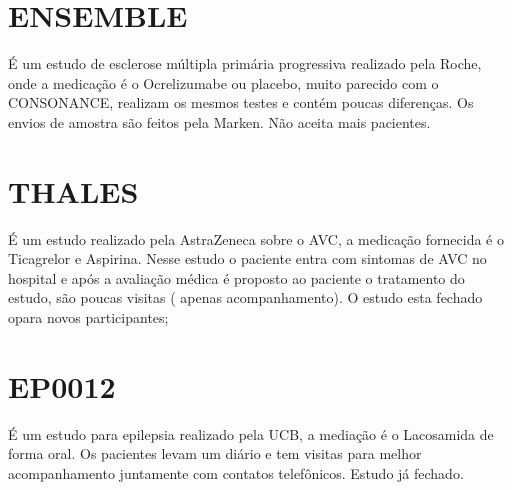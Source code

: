 \section{ENSEMBLE}

É um estudo de esclerose múltipla primária progressiva realizado pela Roche,
onde a medicação é o Ocrelizumabe ou placebo, muito parecido com o CONSONANCE,
realizam os mesmos testes e contém poucas diferenças. Os envios de amostra são
feitos pela Marken. Não aceita mais pacientes. 

\section{THALES} 

É um estudo realizado pela AstraZeneca sobre o AVC, a medicação fornecida é o Ticagrelor e
Aspirina. Nesse estudo o paciente entra com sintomas de AVC no hospital e após a
avaliação médica é proposto ao paciente o tratamento do estudo, são poucas
visitas ( apenas acompanhamento). O estudo esta fechado opara novos participantes;

\section{EP0012} 

É um estudo para epilepsia realizado pela UCB, a mediação é o Lacosamida de forma
oral. Os pacientes levam um diário e tem visitas para melhor acompanhamento
juntamente com contatos telefônicos. Estudo já fechado. 





